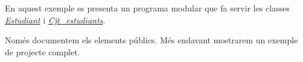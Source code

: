 En aquest exemple es presenta un programa modular que fa servir les classes {\itshape  \hyperlink{class_estudiant}{Estudiant} } i {\itshape  \hyperlink{class_cjt__estudiants}{Cjt\+\_\+estudiants}}.

Només documentem els elements públics. Més endavant mostrarem un exemple de projecte complet. 